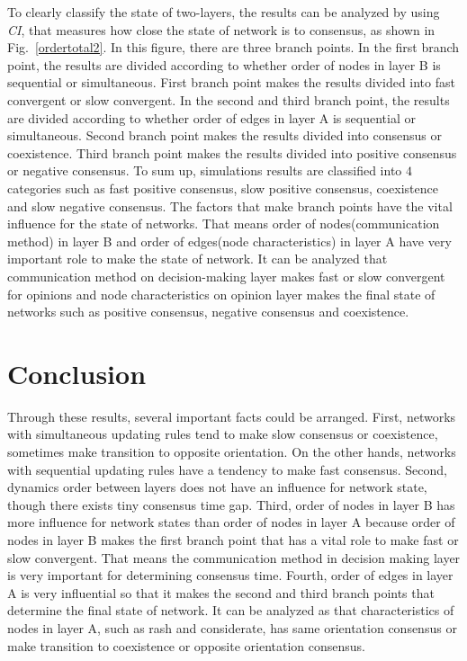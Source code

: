 To clearly classify the state of two-layers, the results can be analyzed by using \textit{CI}, that measures how close the state of network is to consensus, as shown in Fig.~\ref{ordertotal2}. In this figure, there are three branch points. In the first branch point, the results are divided according to whether order of nodes in layer B is sequential or simultaneous. First branch point makes the results divided into fast convergent or slow convergent. In the second and third branch point, the results are divided according to whether order of edges in layer A is sequential or simultaneous. Second branch point makes the results divided into consensus or coexistence. Third branch point makes the results divided into positive consensus or negative consensus. To sum up, simulations results are classified into $4$ categories such as fast positive consensus, slow positive consensus, coexistence and slow negative consensus. The factors that make branch points have the vital influence for the state of networks. That means order of nodes(communication method) in layer B and order of edges(node characteristics) in layer A have very important role to make the state of network. It can be analyzed that communication method on decision-making layer makes fast or slow convergent for opinions and node characteristics on opinion layer makes the final state of networks such as positive consensus, negative consensus and coexistence. \\

\section{Conclusion}
Through these results, several important facts could be arranged. First, networks with simultaneous updating rules tend to make slow consensus or coexistence, sometimes make transition to opposite orientation. On the other hands, networks with sequential updating rules have a tendency to make fast consensus. Second, dynamics order between layers does not have an influence for network state, though there exists tiny consensus time gap. Third, order of nodes in layer B has more influence for network states than order of nodes in layer A because order of nodes in layer B makes the first branch point that has a vital role to make fast or slow convergent. That means the communication method in decision making layer is very important for determining consensus time. Fourth, order of edges in layer A is very influential so that it makes the second and third branch points that determine the final state of network. It can be analyzed as that characteristics of nodes in layer A, such as rash and considerate, has same orientation consensus or make transition to coexistence or opposite orientation consensus.



